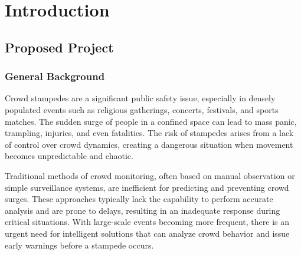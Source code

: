\documentclass[11pt]{report}
\begin{document}
    \begin{abstract}

        India, known for its high population density and diverse cultural landscape, hosts a constant flow of large-scale events, including religious festivals, political rallies, and entertainment gatherings. With millions of people attending these events, managing crowd safety becomes a significant challenge. The risk of stampedes during such events is heightened, given the sheer number of attendees and the limited ability of traditional monitoring systems to predict dangerous situations. 
        \newline
        Large crowds are an inevitable feature of public events, religious gatherings, concerts, and sporting events. While such events bring people together, they also pose serious risks of human-made disasters, such as stampedes. Stampedes occur when overcrowding or sudden panic causes unmanageable surges in crowd movement, leading to injuries and fatalities. Preventing these disasters requires close and careful monitoring and proactive detection of hazardous crowd conditions. 
    \end{abstract}
    \tableofcontents
    \cleardoublepage
    \listoffigures
    \newpage
    \listoftables
    \chapter {Introduction}
    \label{intro}
    \section{Proposed Project}
	\subsection{\label{gn}General Background}
    Crowd stampedes are a significant public safety issue, especially in densely populated events such as religious gatherings, concerts, festivals, and sports matches. The sudden surge of people in a confined space can lead to mass panic, trampling, injuries, and even fatalities. The risk of stampedes arises from a lack of control over crowd dynamics, creating a dangerous situation when movement becomes unpredictable and chaotic. \par
    Traditional methods of crowd monitoring, often based on manual observation or simple surveillance systems, are inefficient for predicting and preventing crowd surges. These approaches typically lack the capability to perform accurate analysis and are prone to delays, resulting in an inadequate response during critical situations. With large-scale events becoming more frequent, there is an urgent need for intelligent solutions that can analyze crowd behavior and issue early warnings before a stampede occurs.
\end{document}
